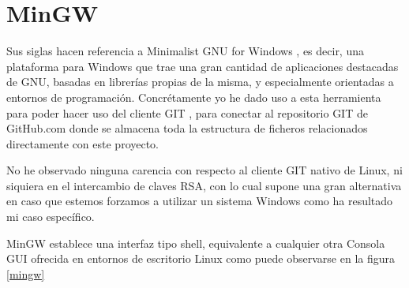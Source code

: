 \section*{MinGW}

Sus siglas hacen referencia a Minimalist GNU for Windows \cite{website:mingw}, es decir, una plataforma para Windows que trae una gran cantidad de aplicaciones destacadas de GNU, basadas en librerías propias de la misma, y especialmente orientadas a entornos de programación. Concrétamente yo he dado uso a esta herramienta para poder hacer uso del cliente GIT \cite{website:git}, para conectar al repositorio GIT de GitHub.com donde se almacena toda la estructura de ficheros relacionados directamente con este proyecto.

No he observado ninguna carencia con respecto al cliente GIT nativo de Linux, ni siquiera en el intercambio de claves RSA, con lo cual supone una gran alternativa en caso que estemos forzamos a utilizar un sistema Windows como ha resultado mi caso específico.

MinGW establece una interfaz tipo shell, equivalente a cualquier otra Consola GUI ofrecida en entornos de escritorio Linux como puede observarse en la figura \ref{mingw}



